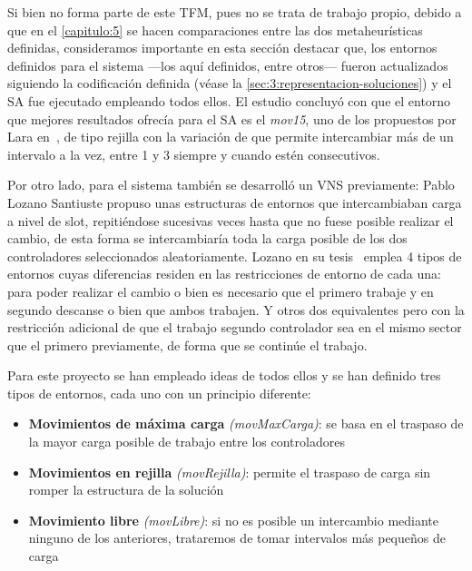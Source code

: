 Si bien no forma parte de este TFM, pues no se trata de trabajo propio, debido a que en el \autoref{capitulo:5} se hacen comparaciones entre las dos metaheurísticas definidas, consideramos importante en esta sección destacar que, los entornos definidos para el sistema \legacy{} ---los aquí definidos, entre otros--- fueron actualizados siguiendo la codificación definida (véase la \autoref{sec:3:representacion-soluciones})
y el SA fue ejecutado empleando todos ellos. El estudio concluyó con que el entorno que mejores resultados ofrecía para el SA es el \textit{mov15}, uno de los propuestos por Lara en~\cite{tesis-jonatan}, de tipo rejilla con la variación de que permite intercambiar más de un intervalo a la vez, entre 1 y 3 siempre y cuando estén consecutivos.

Por otro lado, para el sistema \legacy{} también se desarrolló un VNS previamente: Pablo Lozano Santiuste propuso unas estructuras de entornos que intercambiaban carga a nivel de slot, repitiéndose sucesivas veces hasta que no fuese posible realizar el cambio, de esta forma se intercambiaría toda la carga posible de los dos controladores seleccionados aleatoriamente. Lozano en su tesis~\cite{tesis-pablo} emplea 4 tipos de entornos cuyas diferencias residen en las restricciones de entorno de cada una: para poder realizar el cambio o bien es necesario que el primero trabaje y en segundo descanse o bien que ambos trabajen. Y otros dos equivalentes pero con la restricción adicional de que el trabajo segundo controlador sea en el mismo sector que el primero previamente, de forma que se continúe el trabajo.


Para este proyecto se han empleado ideas de todos ellos y se han definido tres tipos de entornos, cada uno con un principio diferente:
\begin{itemize}
    \item \textbf{Movimientos de máxima carga} \textit{(movMaxCarga)}: se basa en el traspaso de la mayor carga posible de trabajo entre los controladores

    \item \textbf{Movimientos en rejilla} \textit{(movRejilla)}: permite el traspaso de carga sin romper la estructura de la solución

    \item \textbf{Movimiento libre} \textit{(movLibre)}: si no es posible un intercambio mediante ninguno de los anteriores, trataremos de tomar intervalos más pequeños de carga
\end{itemize}

